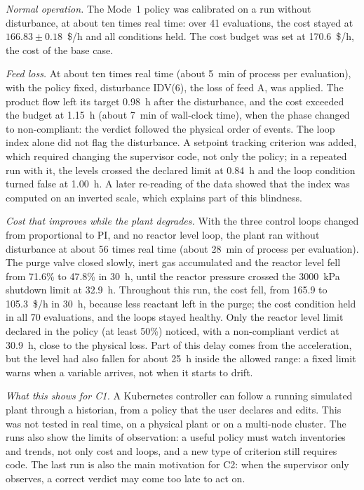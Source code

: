 \documentclass[conference]{IEEEtran}
\begin{document}
\textit{Normal operation.} The Mode~1 policy was calibrated on a run without disturbance, at about ten times real time: over 41 evaluations, the cost stayed at $166.83 \pm 0.18$~\$/h and all conditions held. The cost budget was set at 170.6~\$/h, the cost of the base case.

\textit{Feed loss.} At about ten times real time (about 5~min of process per evaluation), with the policy fixed, disturbance IDV(6), the loss of feed A, was applied. The product flow left its target 0.98~h after the disturbance, and the cost exceeded the budget at 1.15~h (about 7~min of wall-clock time), when the phase changed to non-compliant: the verdict followed the physical order of events. The loop index alone did not flag the disturbance. A setpoint tracking criterion was added, which required changing the supervisor code, not only the policy; in a repeated run with it, the levels crossed the declared limit at 0.84~h and the loop condition turned false at 1.00~h. A later re-reading of the data showed that the index was computed on an inverted scale, which explains part of this blindness.

\textit{Cost that improves while the plant degrades.} With the three control loops changed from proportional to PI, and no reactor level loop, the plant ran without disturbance at about 56 times real time (about 28~min of process per evaluation). The purge valve closed slowly, inert gas accumulated and the reactor level fell from 71.6\% to 47.8\% in 30~h, until the reactor pressure crossed the 3000~kPa shutdown limit at 32.9~h. Throughout this run, the cost fell, from 165.9 to 105.3~\$/h in 30~h, because less reactant left in the purge; the cost condition held in all 70 evaluations, and the loops stayed healthy. Only the reactor level limit declared in the policy (at least 50\%) noticed, with a non-compliant verdict at 30.9~h, close to the physical loss. Part of this delay comes from the acceleration, but the level had also fallen for about 25~h inside the allowed range: a fixed limit warns when a variable arrives, not when it starts to drift.

\textit{What this shows for C1.} A Kubernetes controller can follow a running simulated plant through a historian, from a policy that the user declares and edits. This was not tested in real time, on a physical plant or on a multi-node cluster. The runs also show the limits of observation: a useful policy must watch inventories and trends, not only cost and loops, and a new type of criterion still requires code. The last run is also the main motivation for C2: when the supervisor only observes, a correct verdict may come too late to act on.
\end{document}
